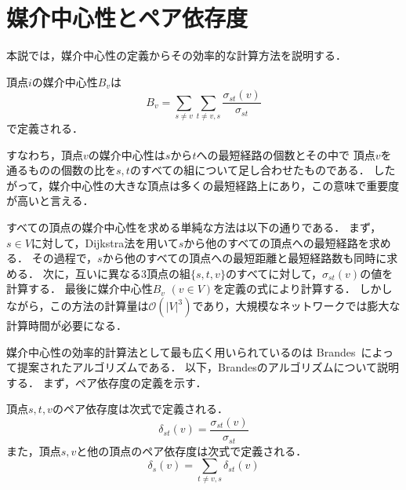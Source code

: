 \section{媒介中心性とペア依存度}
\label{sect:pairwise-dependency}

本説では，媒介中心性の定義からその効率的な計算方法を説明する．

\begin{definition}
  \label{def:betweenness-centrality}
  頂点$i$の媒介中心性$B_v$は
  \begin{equation}
    B_v=\sum_{s\neq v}\sum_{t\neq {v,s}}\frac{\sigma_{st}(v)}{\sigma_{st}}
    \label{eq:betweenness-centrality}
  \end{equation}
  で定義される．
\end{definition}

すなわち，頂点$v$の媒介中心性は$s$から$t$への最短経路の個数とその中で
頂点$v$を通るものの個数の比を$s,t$のすべての組について足し合わせたものである．
したがって，媒介中心性の大きな頂点は多くの最短経路上にあり，この意味で重要度が高いと言える．

すべての頂点の媒介中心性を求める単純な方法は以下の通りである．
まず，$s\in V$に対して，Dijkstra法を用いて$s$から他のすべての頂点への最短経路を求める．
その過程で，$s$から他のすべての頂点への最短距離と最短経路数も同時に求める．
次に，互いに異なる3頂点の組$\{s,t,v\}$のすべてに対して，$\sigma_{st}(v)$の値を計算する．
最後に媒介中心性$B_v$ $(v\in V)$を定義の式により計算する．
しかしながら，この方法の計算量は$\mathcal{O}(|V|^3)$であり，大規模なネットワークでは膨大な計算時間が必要になる．

媒介中心性の効率的計算法として最も広く用いられているのは
Brandes~\cite{Brandes2001}によって提案されたアルゴリズムである．
以下，Brandesのアルゴリズムについて説明する．
まず，ペア依存度の定義を示す．

\begin{definition}
  \label{def:pairwise-dependency}
  頂点$s,t,v$のペア依存度は次式で定義される．
  \begin{equation}
    \label{eq:def-pairwise-dependency}
    \delta_{st}(v)=\frac{\sigma_{st}(v)}{\sigma_{st}}
  \end{equation}
  また，頂点$s,v$と他の頂点のペア依存度は次式で定義される．
  \begin{equation}
    \label{eq:def-sum-pairwise-dependency}
    \delta_{s}(v)=\sum_{t\neq v,s}\delta_{st}(v)
  \end{equation}
\end{definition}

